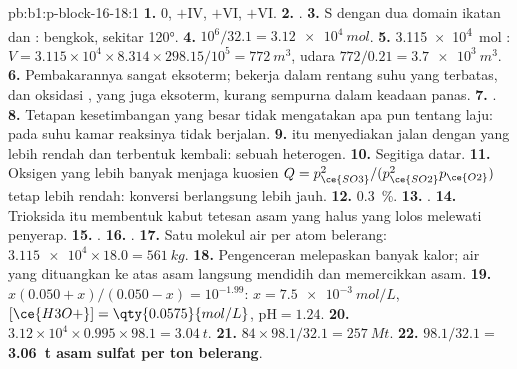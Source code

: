\begin{solution}{pb:b1:p-block-16-18:1}
\textbf{1.} 0, $+$IV, $+$VI, $+$VI.
\textbf{2.} .
\textbf{3.} S dengan dua domain ikatan dan :
bengkok, sekitar \ang{120}.
\textbf{4.} $10^6/32.1 = \qty{3.12e4}{mol}$.
\textbf{5.} \qty{3.115e4}{mol} : $V = 3.115 \times 10^4 \times
8.314 \times 298.15/10^5 = \qty{772}{m^3}$, udara $772/0.21 = \qty{3.7e3}{m^3}$.
\textbf{6.} Pembakarannya sangat eksoterm;  bekerja dalam rentang
suhu yang terbatas, dan oksidasi , yang juga eksoterm, kurang
sempurna dalam keadaan panas.
\textbf{7.} .
\textbf{8.} Tetapan kesetimbangan yang besar tidak mengatakan apa pun
tentang laju: pada suhu kamar reaksinya tidak berjalan.
\textbf{9.}  itu menyediakan jalan dengan  yang
lebih rendah dan terbentuk kembali: sebuah  heterogen.
\textbf{10.} Segitiga datar.
\textbf{11.} Oksigen yang lebih banyak menjaga kuosien
$Q = p_{\ce{SO3}}^2/(p_{\ce{SO2}}^2 p_{\ce{O2}})$ tetap lebih rendah:
konversi  berlangsung lebih jauh.
\textbf{12.} \qty{0.3}{\percent}.
\textbf{13.} .
\textbf{14.} Trioksida itu membentuk kabut tetesan asam yang halus yang lolos
melewati penyerap.
\textbf{15.} .
\textbf{16.} .
\textbf{17.} Satu molekul air per atom belerang: $\num{3.115e4} \times 18.0 =
\qty{561}{kg}$.
\textbf{18.} Pengenceran melepaskan banyak kalor; air yang dituangkan ke
atas asam langsung mendidih dan memercikkan asam.
\textbf{19.} $x(0.050 + x)/(0.050 - x) = 10^{-1.99}$: $x = \qty{7.5e-3}{mol/L}$,
$[\ce{H3O+}] = \qty{0.0575}{mol/L}$, $\mathrm{pH} = 1.24$.
\textbf{20.} $3.12 \times 10^4 \times 0.995 \times 98.1 = \qty{3.04}{t}$.
\textbf{21.} $84 \times 98.1/32.1 = \qty{257}{Mt}$.
\textbf{22.} $98.1/32.1 =$ \textbf{\qty{3.06}{t} asam sulfat per ton
belerang}.
\end{solution}
